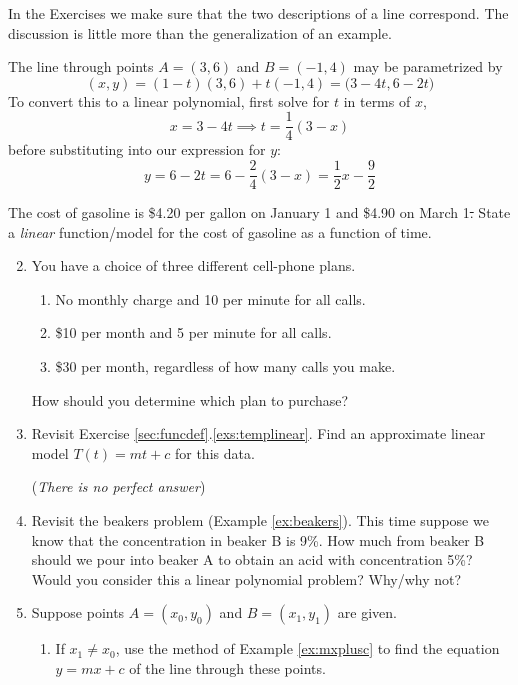 In the Exercises we make sure that the two descriptions of a line correspond. The discussion is little more than the generalization of an example.

\begin{example}{}{}
	The line through points $A=(3,6)$ and $B=(-1,4)$ may be parametrized by
	\[
		(x,y)=(1-t)(3,6)+t(-1,4)=\bigl(3-4t,6-2t\bigr)
	\]
	To convert this to a linear polynomial, first solve for $t$ in terms of $x$,
	\[
		x=3-4t\implies t=\frac 14(3-x)
	\]
	before substituting into our expression for $y$:
	\[
		y=6-2t=6-\frac 24(3-x) =\frac 12x-\frac 92
	\]
\end{example}



\goodbreak



\begin{exercises}{}{}
	\exstart The cost of gasoline is \$4.20 per gallon on January 1\st{} and \$4.90 on March 1\st. State a \emph{linear} function/model for the cost of gasoline as a function of time.


	\begin{enumerate}\setcounter{enumi}{1}
	  \item You have a choice of three different cell-phone plans.
	  \begin{enumerate}
	    \item No monthly charge and 10\textcent{} per minute for all calls.
	    \item \$10 per month and 5\textcent{} per minute for all calls.
	    \item \$30 per month, regardless of how many calls you make.
	  \end{enumerate}
	  How should you determine which plan to purchase?
	  
	  
	  \item Revisit Exercise \ref*{sec:funcdef}.\ref{exs:templinear}. Find an approximate linear model $T(t)=mt+c$ for this data.\par
	  (\emph{There is no perfect answer})
	  
	  
	  \item Revisit the beakers problem (Example \ref{ex:beakers}). This time suppose we know that the concentration in beaker B is 9\%. How much from beaker B should we pour into beaker A to obtain an acid with concentration 5\%? Would you consider this a linear polynomial problem? Why/why not?
    
    
    \item\label{exs:lineparam}
    Suppose points $A=(x_0,y_0)$ and $B=(x_1,y_1)$ are given. 
    \begin{enumerate}
      \item If $x_1\neq x_0$, use the method of Example \ref{ex:mxplusc} to find the equation $y=mx+c$ of the line through these points.
      

\end{enumerate}
\end{enumerate}
\end{exercises}

